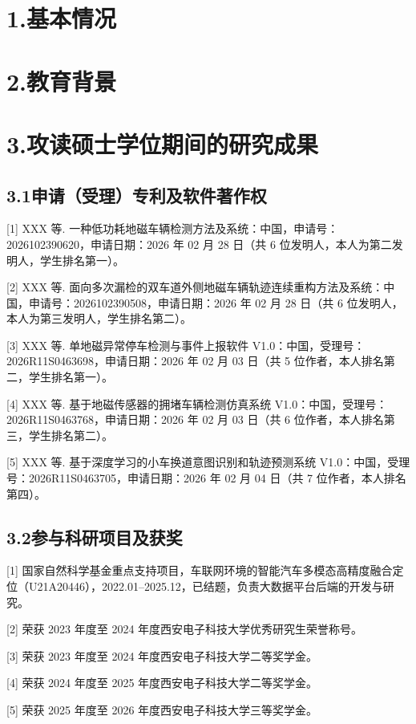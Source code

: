 
\section*{1.\quad 基本情况}

\section*{2.\quad 教育背景}

\section*{3.\quad 攻读硕士学位期间的研究成果}

\subsection*{3.1\quad 申请（受理）专利及软件著作权}

[1] XXX 等. 一种低功耗地磁车辆检测方法及系统：中国，申请号：2026102390620，申请日期：2026 年 02 月 28 日（共 6 位发明人，本人为第二发明人，学生排名第一）。

[2] XXX 等. 面向多次漏检的双车道外侧地磁车辆轨迹连续重构方法及系统：中国，申请号：2026102390508，申请日期：2026 年 02 月 28 日（共 6 位发明人，本人为第三发明人，学生排名第二）。

[3] XXX 等. 单地磁异常停车检测与事件上报软件 V1.0：中国，受理号：2026R11S0463698，申请日期：2026 年 02 月 03 日（共 5 位作者，本人排名第二，学生排名第一）。

[4] XXX 等. 基于地磁传感器的拥堵车辆检测仿真系统 V1.0：中国，受理号：2026R11S0463768，申请日期：2026 年 02 月 03 日（共 6 位作者，本人排名第三，学生排名第二）。

[5] XXX 等. 基于深度学习的小车换道意图识别和轨迹预测系统 V1.0：中国，受理号：2026R11S0463705，申请日期：2026 年 02 月 04 日（共 7 位作者，本人排名第四）。

\subsection*{3.2\quad 参与科研项目及获奖}

[1] 国家自然科学基金重点支持项目，车联网环境的智能汽车多模态高精度融合定位（U21A20446），2022.01--2025.12，已结题，负责大数据平台后端的开发与研究。

[2] 荣获 2023 年度至 2024 年度西安电子科技大学优秀研究生荣誉称号。

[3] 荣获 2023 年度至 2024 年度西安电子科技大学二等奖学金。

[4] 荣获 2024 年度至 2025 年度西安电子科技大学二等奖学金。

[5] 荣获 2025 年度至 2026 年度西安电子科技大学三等奖学金。



